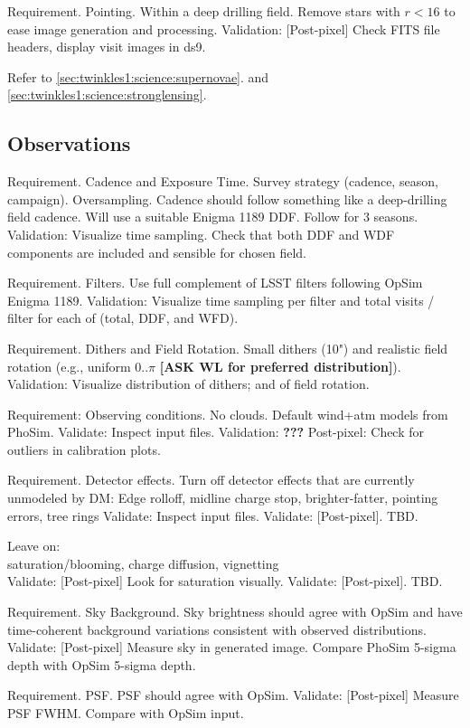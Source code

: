 Requirement. Pointing. 
Within a deep drilling field. Remove stars with $r < 16$ to ease image generation and processing.
Validation: [Post-pixel] Check FITS file headers, display visit images in ds9.  

Refer to \autoref{sec:twinkles1:science:supernovae}.
and \autoref{sec:twinkles1:science:stronglensing}.




\subsection{Observations}

Requirement. Cadence and Exposure Time.
Survey strategy (cadence, season, campaign). Oversampling.
Cadence should follow something like a deep-drilling field cadence.  Will use a suitable Enigma 1189 DDF.
Follow for 3 seasons.
Validation: Visualize time sampling.  Check that both DDF and WDF components are included and sensible for chosen field.

Requirement.  Filters. 
Use full complement of LSST filters following OpSim Enigma 1189.
Validation: Visualize time sampling per filter and total visits / filter for each of (total, DDF, and WFD).

Requirement.  Dithers and Field Rotation.
Small dithers (10") and realistic field rotation (e.g., uniform 0..$\pi$ {\bf [ASK WL for preferred distribution]}). 
Validation: Visualize distribution of dithers; and of field rotation.

Requirement:  Observing conditions.
No clouds.  Default wind+atm models from PhoSim.
Validate: Inspect input files.
Validation: {\bf ???}  Post-pixel: Check for outliers in calibration plots.  


Requirement.  Detector effects.
Turn off detector effects that are currently unmodeled by DM:
  Edge rolloff, midline charge stop, brighter-fatter, pointing errors, tree rings
Validate: Inspect input files.
Validate: [Post-pixel].  TBD.

Leave on:\\
saturation/blooming, charge diffusion, vignetting \\
Validate: [Post-pixel] Look for saturation visually.
Validate: [Post-pixel].  TBD.

Requirement. Sky Background.
Sky brightness should agree with OpSim and have time-coherent background variations consistent with observed distributions.
Validate: [Post-pixel] Measure sky in generated image.  Compare PhoSim 5-sigma depth with OpSim 5-sigma depth.

Requirement. PSF.
PSF should agree with OpSim.
Validate: [Post-pixel]  Measure PSF FWHM.  Compare with OpSim input.

